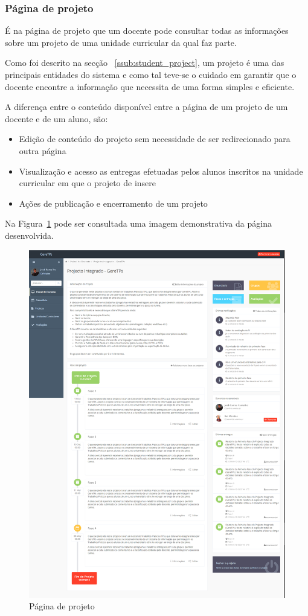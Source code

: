 \subsubsection{Página de projeto}

É na página de projeto que um docente pode consultar todas as informações sobre um projeto de uma unidade curricular da qual faz parte.

Como foi descrito na secção ~\ref{ssub:student_project}, um projeto é uma das principais entidades do sistema e como tal teve-se o cuidado em garantir que o docente encontre a informação que necessita de uma forma simples e eficiente.

A diferença entre o conteúdo disponível entre a página de um projeto de um docente e de um aluno, são:

\begin{itemize}
	\item Edição de conteúdo do projeto sem necessidade de ser redirecionado para outra página
	\item Visualização e acesso as entregas efetuadas pelos alunos inscritos na unidade curricular em que o projeto de insere
	\item Ações de publicação e encerramento de um projeto
\end{itemize}

Na Figura~\ref{fig:teacher_project} pode ser consultada uma imagem demonstrativa da página desenvolvida.

\begin{figure}[H]
  \centering
  \includegraphics[width=.8\textwidth,center]{images/implementacao/docentes/project}
  \caption{Página de projeto}
  \label{fig:teacher_project}
\end{figure}
